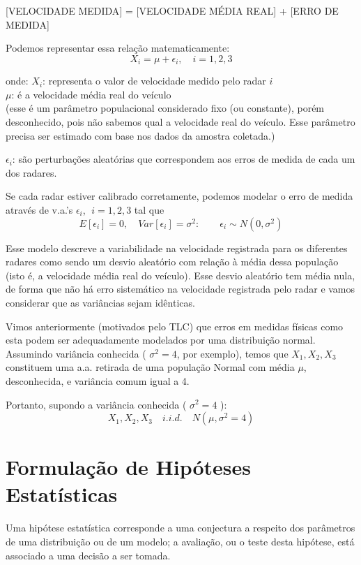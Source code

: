 \documentclass[
]{book}
\theoremstyle{definition}
\theoremstyle{definition}
\theoremstyle{definition}
\theoremstyle{remark}
\begin{document}
{[}VELOCIDADE MEDIDA{]} = {[}VELOCIDADE MÉDIA REAL{]} + {[}ERRO DE MEDIDA{]}

Podemos representar essa relação matematicamente:
\[X_i = \mu + \epsilon_i, \quad i = 1,2,3\]

onde:
\(X_i\): representa o valor de velocidade medido pelo radar \(i\)\\
\(\mu\): é a velocidade média real do veículo\\
(esse é um parâmetro populacional considerado fixo (ou constante), porém desconhecido, pois não sabemos qual a velocidade real do veículo. Esse parâmetro precisa ser estimado com base nos dados da amostra coletada.)

\(\epsilon_i\): são perturbações aleatórias que correspondem aos erros de medida de cada um dos radares.

Se cada radar estiver calibrado corretamente, podemos modelar o erro de medida através de v.a.'s \(\epsilon_i\), \(\; i = 1,2,3\) tal que
\[E[\epsilon_i] = 0, \quad Var[\epsilon_i] = \sigma^2: \qquad \epsilon_{i} \sim N(0, \sigma^2)\]

Esse modelo descreve a variabilidade na velocidade registrada para os diferentes radares como sendo um desvio aleatório com relação à média dessa população (isto é, a velocidade média real do veículo). Esse desvio aleatório tem média nula, de forma que não há erro sistemático na velocidade registrada pelo radar e vamos considerar que as variâncias sejam idênticas.

Vimos anteriormente (motivados pelo TLC) que erros em medidas físicas como esta podem
ser adequadamente modelados por uma distribuição normal. Assumindo variância conhecida ( \(\sigma^2 = 4\), por exemplo), temos que \(X_1, X_2, X_3\) constituem uma a.a. retirada de uma população Normal com média \(\mu\), desconhecida, e variância comum igual a 4.

Portanto, supondo a variância conhecida ( \(\sigma^2 =4\) ):
\[X_1, X_2, X_3 \quad i.i.d. \quad N(\mu, \sigma^2=4)\]

\hypertarget{formulauxe7uxe3o-de-hipuxf3teses-estatuxedsticas}{%
\section{Formulação de Hipóteses Estatísticas}\label{formulauxe7uxe3o-de-hipuxf3teses-estatuxedsticas}}

Uma hipótese estatística corresponde a uma conjectura a respeito dos parâmetros de uma distribuição ou de um modelo; a avaliação, ou o teste desta hipótese, está associado a uma decisão a ser tomada.
\end{document}
